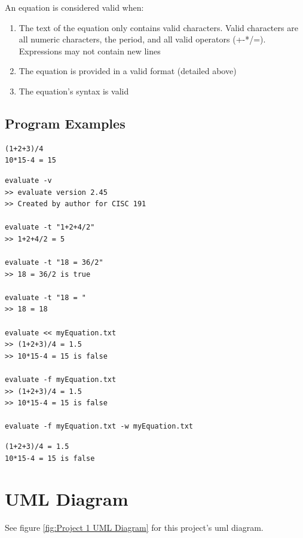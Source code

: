 \documentclass{article}
\begin{document}
An equation is considered valid when:
\begin{enumerate}
	\item The text of the equation only contains valid characters. Valid characters are all numeric characters, the period, and all valid operators (+-*/=). Expressions may not contain new lines
	\item The equation is provided in a valid format (detailed above)
	\item The equation's syntax is valid
\end{enumerate}

\subsection{Program Examples}
\begin{lstlisting}[title=myEquation.txt]
(1+2+3)/4
10*15-4 = 15
\end{lstlisting}

\begin{lstlisting}[title=Commands]
evaluate -v
>> evaluate version 2.45
>> Created by author for CISC 191

evaluate -t "1+2+4/2"
>> 1+2+4/2 = 5

evaluate -t "18 = 36/2"
>> 18 = 36/2 is true

evaluate -t "18 = "
>> 18 = 18

evaluate << myEquation.txt
>> (1+2+3)/4 = 1.5
>> 10*15-4 = 15 is false

evaluate -f myEquation.txt
>> (1+2+3)/4 = 1.5
>> 10*15-4 = 15 is false

evaluate -f myEquation.txt -w myEquation.txt
\end{lstlisting}

\begin{lstlisting}[title=myEquation.txt after commands are executed]
(1+2+3)/4 = 1.5
10*15-4 = 15 is false
\end{lstlisting}

\section{UML Diagram}
See figure \ref{fig:Project 1 UML Diagram} for this project's uml diagram.
\end{document}
